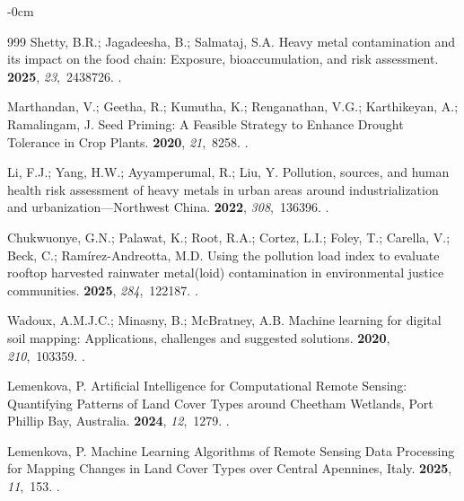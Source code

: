 \documentclass[environremediat,article,accept,pdftex,oneauthor]{Definitions/mdpi}
\begin{document}
\begin{adjustwidth}{-\extralength}{0cm}
\begin{thebibliography}{999}
Shetty, B.R.; Jagadeesha, B.; Salmataj, S.A.
\newblock Heavy metal contamination and its impact on the food chain: Exposure,
  bioaccumulation, and risk assessment.
 {\bf 2025}, {\em 23},~2438726.
.

Marthandan, V.; Geetha, R.; Kumutha, K.; Renganathan, V.G.; Karthikeyan, A.; Ramalingam, J.
\newblock Seed Priming: A Feasible Strategy to Enhance Drought Tolerance in
  Crop Plants.
 {\bf 2020}, {\em
  21},~8258.
.

Li, F.J.; Yang, H.W.; Ayyamperumal, R.; Liu, Y.
\newblock Pollution, sources, and human health risk assessment of heavy metals
  in urban areas around industrialization and urbanization---Northwest China.
 {\bf 2022}, {\em 308},~136396.
.

Chukwuonye, G.N.; Palawat, K.; Root, R.A.; Cortez, L.I.; Foley, T.; Carella, V.; Beck, C.; Ramírez-Andreotta, M.D.
\newblock Using the pollution load index to evaluate rooftop harvested
  rainwater metal(loid) contamination in environmental justice communities.
 {\bf 2025}, {\em 284},~122187.
.

Wadoux, A.M.J.C.; Minasny, B.; McBratney, A.B.
\newblock Machine learning for digital soil mapping: Applications, challenges
  and suggested solutions.
 {\bf 2020}, {\em 210},~103359.
.

Lemenkova, P.
\newblock Artificial Intelligence for Computational Remote Sensing: Quantifying
  Patterns of Land Cover Types around Cheetham Wetlands, Port Phillip Bay,
  Australia.
 {\bf 2024}, {\em
  12},~1279.
.

Lemenkova, P.
\newblock Machine Learning Algorithms of Remote Sensing Data Processing for
  Mapping Changes in Land Cover Types over Central Apennines, Italy.
 {\bf 2025}, {\em 11},~153.
.


\end{thebibliography}
\end{adjustwidth}
\end{document}
